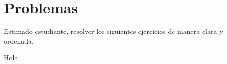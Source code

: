 \section*{\large Problemas}

\vspace{-3mm}

Estimado estudiante, resolver los siguientes ejercicios de manera clara y ordenada.

\begin{exercise}
    Hola
\end{exercise}